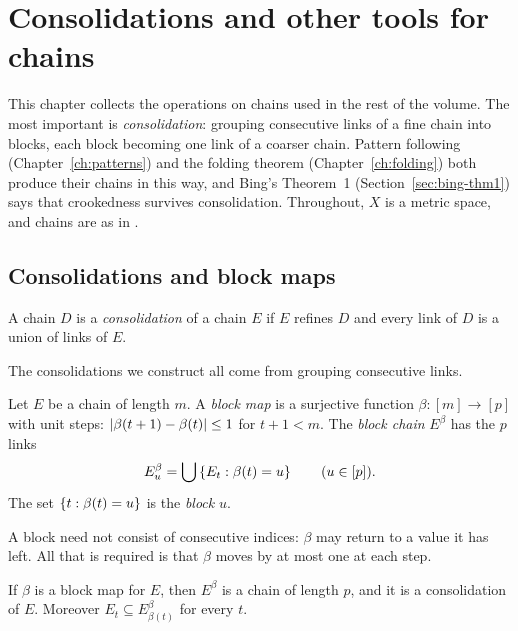 \chapter{Consolidations and other tools for chains}\label{ch:consolidations}

This chapter collects the operations on chains used in the rest of the volume. The most
important is \emph{consolidation}: grouping consecutive links of a fine chain into blocks, each
block becoming one link of a coarser chain. Pattern following (Chapter~\ref{ch:patterns}) and
the folding theorem (Chapter~\ref{ch:folding}) both produce their chains in this way, and
Bing's Theorem~1 (Section~\ref{sec:bing-thm1}) says that crookedness survives consolidation.
Throughout, $X$ is a metric space, and chains are as in .

\section{Consolidations and block maps}

\begin{definition}\label{def:consolidation}
A chain $D$ is a \emph{consolidation} of a chain $E$ if $E$ refines $D$ and every link of $D$ is a
union of links of $E$.
\end{definition}


The consolidations we construct all come from grouping consecutive links.

\begin{definition}\label{def:block-map}
Let $E$ be a chain of length $m$. A \emph{block map} is a surjective function $\beta\colon[m]\to[p]$
with unit steps: $\left\lvert \beta(t+1)-\beta(t)\right\rvert\le1$ for $t+1<m$. The \emph{block chain} $E^\beta$ has
the $p$ links
\[
E^\beta_u=\bigcup\left\{ E_t : \beta(t)=u \right\}\qquad(u\in[p]).
\]
The set $\left\{ t:\beta(t)=u \right\}$ is the \emph{block} $u$.
\end{definition}

A block need not consist of consecutive indices: $\beta$ may return to a value it has left. All
that is required is that $\beta$ moves by at most one at each step.

\begin{lemma}\label{lem:block-chain}
If $\beta$ is a block map for $E$, then $E^\beta$ is a chain of length $p$, and it is a
consolidation of $E$. Moreover $E_t\subseteq E^\beta_{\beta(t)}$ for every $t$.
\end{lemma}

